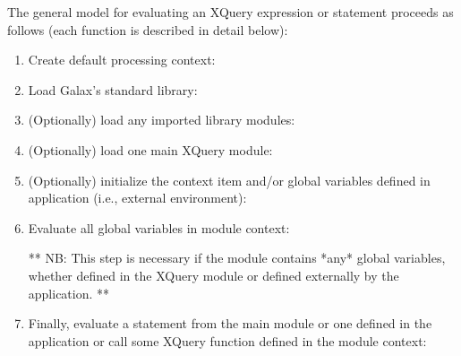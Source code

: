   The general model for evaluating an XQuery expression or statement
  proceeds as follows (each function is described in detail below):
\begin{enumerate}
\item Create default processing context:


\item Load Galax's standard library:


\item (Optionally) load any imported library modules:


\item (Optionally) load one main XQuery module:


\item (Optionally) initialize the context item and/or global variables
     defined in application (i.e., external environment):


\item Evaluate all global variables in module context:


     ** NB: This step is necessary if the module contains *any*
       global variables, whether defined in the XQuery module or
       defined externally by the application. **

\item Finally, evaluate a statement from the main module or one defined
     in the application or call some XQuery function defined in the
     module context:



\end{enumerate}

